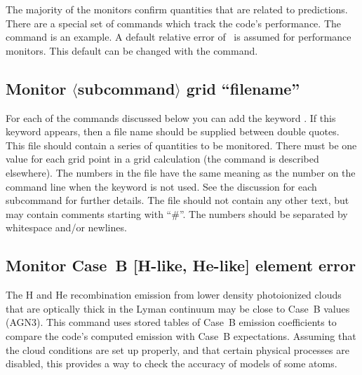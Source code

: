 The majority of the monitors confirm quantities that are related to
predictions.
There are a special set of  commands which
track the code's performance.  
The  command is an example.
A default relative error of \ErrorDefaultPerformance\ is assumed for
performance monitors.
This default can be changed with the
 command.

\subsection{Monitor $\langle$subcommand$\rangle$ grid ``filename''}

For each of the commands discussed below you can add the keyword
. If this keyword appears, then a file name should be
supplied between double quotes. This file should contain a series of
quantities to be monitored. There must be one value for each grid point in a
grid calculation (the  command is described elsewhere). The
numbers in the file have the same meaning as the number on the command line
when the  keyword is not used. See the discussion for each
subcommand for further details. The file should not contain any other text,
but may contain comments starting with ``\#''. The numbers should be separated by whitespace and/or
newlines.

\subsection{Monitor Case~B [H-like, He-like]  element error}

The H and He recombination emission from lower density
photoionized clouds
that are optically thick in the Lyman continuum may be
close to Case~B values (AGN3).
This command uses stored tables of Case~B emission coefficients
to compare the code's computed emission with Case~B expectations.
Assuming that the cloud conditions are set up properly,
and that certain physical processes are disabled,
this provides a way to check the accuracy of models
of some atoms.

